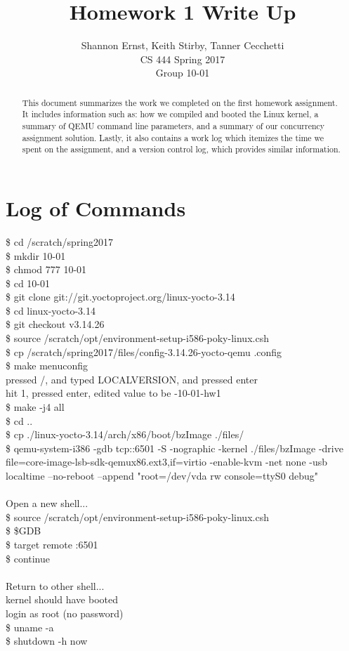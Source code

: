 \documentclass[letterpaper,10pt,serif,draftclsnofoot,onecolumn,compsoc,titlepage]{article}%
\title{Homework 1 Write Up}
\author{Shannon Ernst, Keith Stirby, Tanner Cecchetti \\ CS 444 Spring 2017 \\ Group 10-01}
\begin{document}
\maketitle
\begin{abstract}
This document summarizes the work we completed on the first homework assignment.
It includes information such as: how we compiled and booted the Linux kernel,
a summary of QEMU command line parameters, and a summary of our concurrency assignment
solution. Lastly, it also contains a work log which itemizes the time we spent on
the assignment, and a version control log, which provides similar information.
\end{abstract}
\newpage
\section{Log of Commands}
\$ cd /scratch/spring2017 \\
\$ mkdir 10-01 \\
\$ chmod 777 10-01 \\
\$ cd 10-01 \\
\$ git clone git://git.yoctoproject.org/linux-yocto-3.14 \\
\$ cd linux-yocto-3.14 \\
\$ git checkout v3.14.26 \\
\$ source /scratch/opt/environment-setup-i586-poky-linux.csh \\
\$ cp /scratch/spring2017/files/config-3.14.26-yocto-qemu .config \\
\$ make menuconfig \\
pressed /, and typed LOCALVERSION, and pressed enter \\
hit 1, pressed enter, edited value to be -10-01-hw1 \\
\$ make -j4 all \\
\$ cd .. \\
\$ cp ./linux-yocto-3.14/arch/x86/boot/bzImage ./files/ \\
\$ qemu-system-i386 -gdb tcp::6501 -S -nographic -kernel ./files/bzImage -drive
file=core-image-lsb-sdk-qemux86.ext3,if=virtio -enable-kvm -net none -usb
localtime --no-reboot --append "root=/dev/vda rw console=ttyS0 debug" \\
\\ Open a new shell... \\
\$ source /scratch/opt/environment-setup-i586-poky-linux.csh \\
\$ \$GDB \\
\$ target remote :6501 \\
\$ continue \\
\\ Return to other shell... \\
kernel should have booted \\
login as root (no password) \\
\$ uname -a \\
\$ shutdown -h now
\end{document}
